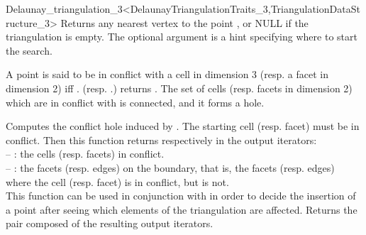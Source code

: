 \begin{ccRefClass}{Delaunay_triangulation_3<DelaunayTriangulationTraits_3,TriangulationDataStructure_3>}
{Returns any nearest vertex to the point , or NULL if the triangulation
is empty.  The optional argument  is a hint specifying where to start
the search.  
}

A point  is said to be in conflict with a cell  in dimension 3
(resp. a facet  in dimension 2) iff \ccVar.
(resp. \ccVar.) returns .
The set of cells (resp. facets in dimension 2) which are in conflict with
 is connected, and it forms a hole.

{Computes the conflict hole induced by .  The starting cell
(resp.  facet)  must be in conflict.  Then this function returns
respectively in the output iterators:\\
-- : the cells (resp. facets) in conflict.\\
-- : the facets (resp. edges) on the boundary, that is, the facets
(resp. edges)  where the cell (resp. facet)  is in
conflict, but  is not.\\
This function can be used in conjunction with  in order
to decide the insertion of a point after seeing which elements of the
triangulation are affected.
Returns the pair composed of the resulting output iterators.
}


\end{ccRefClass}
